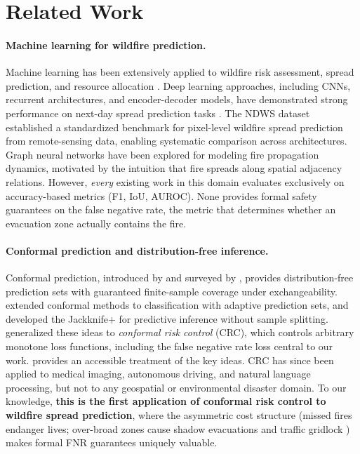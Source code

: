 \documentclass{article}
\begin{document}
\section{Related Work}

\paragraph{Machine learning for wildfire prediction.}
Machine learning has been extensively applied to wildfire risk assessment, spread prediction, and resource allocation \citep{jain2020review}.
Deep learning approaches, including CNNs, recurrent architectures, and encoder-decoder models, have demonstrated strong performance on next-day spread prediction tasks \citep{radke2019firecast}.
The NDWS dataset \citep{huot2022next} established a standardized benchmark for pixel-level wildfire spread prediction from remote-sensing data, enabling systematic comparison across architectures.
Graph neural networks \citep{kipf2017semi, veličković2018graph} have been explored for modeling fire propagation dynamics, motivated by the intuition that fire spreads along spatial adjacency relations.
However, \emph{every} existing work in this domain evaluates exclusively on accuracy-based metrics (F1, IoU, AUROC).
None provides formal safety guarantees on the false negative rate, the metric that determines whether an evacuation zone actually contains the fire.

\paragraph{Conformal prediction and distribution-free inference.}
Conformal prediction, introduced by \citet{vovk2005algorithmic} and surveyed by \citet{shafer2008tutorial}, provides distribution-free prediction sets with guaranteed finite-sample coverage under exchangeability.
\citet{romano2020classification} extended conformal methods to classification with adaptive prediction sets, and \citet{barber2021predictive} developed the Jackknife+ for predictive inference without sample splitting.
\citet{angelopoulos2022conformal} generalized these ideas to \emph{conformal risk control} (CRC), which controls arbitrary monotone loss functions, including the false negative rate loss central to our work.
\citet{angelopoulos2021gentle} provides an accessible treatment of the key ideas.
CRC has since been applied to medical imaging, autonomous driving, and natural language processing, but not to any geospatial or environmental disaster domain.
To our knowledge, \textbf{this is the first application of conformal risk control to wildfire spread prediction}, where the asymmetric cost structure (missed fires endanger lives; over-broad zones cause shadow evacuations and traffic gridlock \citep{zhao2022evacuation}) makes formal FNR guarantees uniquely valuable.
\end{document}
